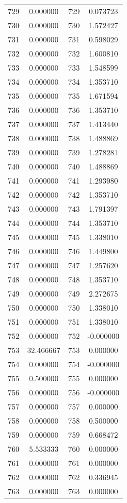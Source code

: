 \documentclass[12pt]{article}
\begin{document}
\begin{longtable}{@{}cccc@{}}
729 & 0.000000 & 729 & 0.073723 \\
730 & 0.000000 & 730 & 1.572427 \\
731 & 0.000000 & 731 & 0.598029 \\
732 & 0.000000 & 732 & 1.600810 \\
733 & 0.000000 & 733 & 1.548599 \\
734 & 0.000000 & 734 & 1.353710 \\
735 & 0.000000 & 735 & 1.671594 \\
736 & 0.000000 & 736 & 1.353710 \\
737 & 0.000000 & 737 & 1.413440 \\
738 & 0.000000 & 738 & 1.488869 \\
739 & 0.000000 & 739 & 1.278281 \\
740 & 0.000000 & 740 & 1.488869 \\
741 & 0.000000 & 741 & 1.293980 \\
742 & 0.000000 & 742 & 1.353710 \\
743 & 0.000000 & 743 & 1.791397 \\
744 & 0.000000 & 744 & 1.353710 \\
745 & 0.000000 & 745 & 1.338010 \\
746 & 0.000000 & 746 & 1.449800 \\
747 & 0.000000 & 747 & 1.257620 \\
748 & 0.000000 & 748 & 1.353710 \\
749 & 0.000000 & 749 & 2.272675 \\
750 & 0.000000 & 750 & 1.338010 \\
751 & 0.000000 & 751 & 1.338010 \\
752 & 0.000000 & 752 & -0.000000 \\
753 & 32.466667 & 753 & 0.000000 \\
754 & 0.000000 & 754 & -0.000000 \\
755 & 0.500000 & 755 & 0.000000 \\
756 & 0.000000 & 756 & -0.000000 \\
757 & 0.000000 & 757 & 0.000000 \\
758 & 0.000000 & 758 & 0.500000 \\
759 & 0.000000 & 759 & 0.668472 \\
760 & 5.533333 & 760 & 0.000000 \\
761 & 0.000000 & 761 & 0.000000 \\
762 & 0.000000 & 762 & 0.336945 \\
763 & 0.000000 & 763 & 0.000000 \\

\end{longtable}
\end{document}
